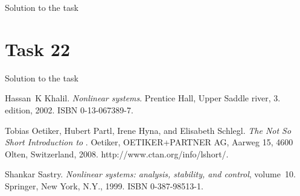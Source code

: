 \documentclass[a4paper,12pt,oneside,onecolumn]{article} %
\begin{document}
Solution to the task

\section*{Task 22}

Solution to the task




\begin{thebibliography}{99}
Hassan~K Khalil.
\newblock \emph{Nonlinear systems}.
\newblock Prentice Hall, Upper Saddle river, 3. edition, 2002.
\newblock ISBN 0-13-067389-7.

Tobias Oetiker, Hubert Partl, Irene Hyna, and Elisabeth Schlegl.
\newblock \emph{The Not So Short Introduction to \LaTeXe}.
\newblock Oetiker, OETIKER+PARTNER AG, Aarweg 15, 4600 Olten, Switzerland,
  2008.
\newblock http://www.ctan.org/info/lshort/.

Shankar Sastry.
\newblock \emph{Nonlinear systems: analysis, stability, and control},
  volume~10.
\newblock Springer, New York, N.Y., 1999.
\newblock ISBN 0-387-98513-1.
\end{thebibliography}
\end{document}
